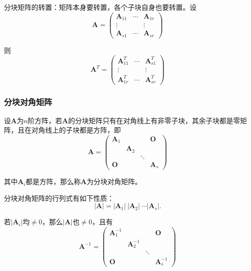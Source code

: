 \documentclass[12pt, a4paper, oneside]{ctexart}
\begin{document}
分块矩阵的转置：矩阵本身要转置，各个子块自身也要转置。设
\begin{equation*}
  \mathbf{A}=\begin{pmatrix}
    \mathbf{A}_{11} & \cdots & \mathbf{A}_{1r} \\
    \vdots & & \vdots \\
    \mathbf{A}_{s1} & \cdots & \mathbf{A}_{sr}
  \end{pmatrix}
\end{equation*}

则
\begin{equation*}
  \mathbf{A}^T=\begin{pmatrix}
    \mathbf{A}_{11}^T & \cdots & \mathbf{A}_{s1}^T \\
    \vdots & & \vdots \\
    \mathbf{A}_{1r}^T & \cdots & \mathbf{A}_{sr}^T
  \end{pmatrix}
\end{equation*}

\subsubsection{分块对角矩阵}

设$\mathbf{A}$为$n$阶方阵，若$\mathbf{A}$的分块矩阵只有在对角线上有非零子块，其余子块都是零矩阵，且在对角线上的子块都是方阵，即
\begin{equation*}
  \mathbf{A}=\begin{pmatrix}
    \mathbf{A}_1 & & & \mathbf{O} \\
    & \mathbf{A}_2 & & \\
    & & \ddots & \\
    \mathbf{O} & & & \mathbf{A}_s
  \end{pmatrix}
\end{equation*}

其中$\mathbf{A}_i$都是方阵，那么称$\mathbf{A}$为分块对角矩阵。

分块对角矩阵的行列式有如下性质：
\begin{equation*}
  |\mathbf{A}|=|\mathbf{A}_1|\ |\mathbf{A}_2|\ \cdots |\mathbf{A}_s|.
\end{equation*}

若$|\mathbf{A}_i|$均$\neq 0$，那么$|\mathbf{A}|$也$\neq 0$，且有
\begin{equation*}
  \mathbf{A}^{-1}=\begin{pmatrix}
    \mathbf{A}_1^{-1} & & & \mathbf{O} \\
    & \mathbf{A}_2^{-1} & & \\
    & & \ddots & \\
    \mathbf{O} & & & \mathbf{A}_s^{-1}
  \end{pmatrix}
\end{equation*}
\end{document}
